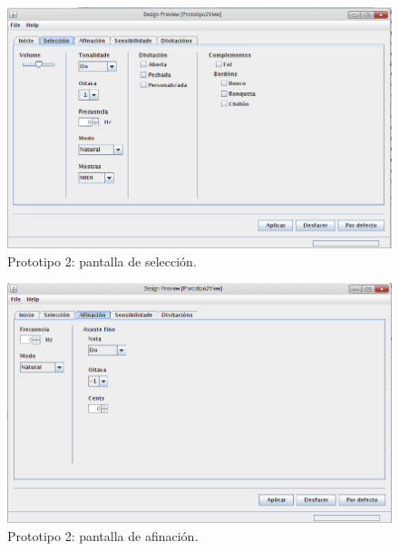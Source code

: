  \begin{figure}[htbp]
  \centering
  \includegraphics[scale=0.6,keepaspectratio=true]{./imagenes/prototipo2_02.png}
  \caption{Prototipo 2: pantalla de selección.}
  \label{figura:Prototipo2Seleccion}
 \end{figure}

 \begin{figure}[htbp]
  \centering
  \includegraphics[scale=0.6,keepaspectratio=true]{./imagenes/prototipo2_03.png}
  \caption{Prototipo 2: pantalla de afinación.}
  \label{figura:Prototipo2Afinacion}
 \end{figure}

